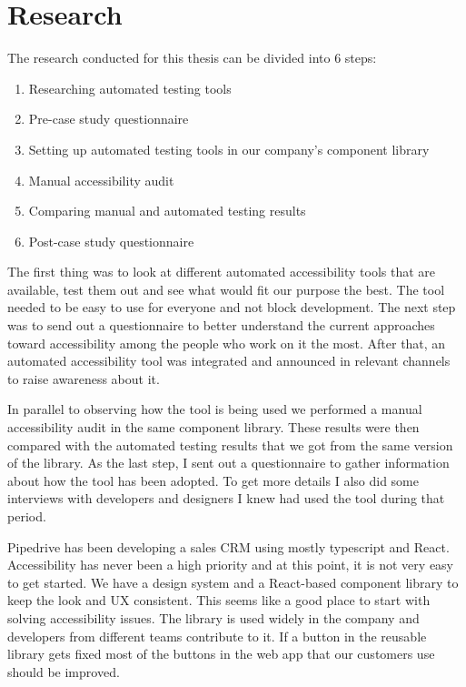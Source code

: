\documentclass{master_thesis}
\begin{document}
\section{Research}

The research conducted for this thesis can be divided into 6 steps:

\begin{enumerate}
	\item Researching automated testing tools
	\item Pre-case study questionnaire
	\item Setting up automated testing tools in our company's component library
	\item Manual accessibility audit
	\item Comparing manual and automated testing results
	\item Post-case study questionnaire
\end{enumerate}

The first thing was to look at different automated accessibility tools that are available, test them out and see what would fit our purpose the best. The tool needed to be easy to use for everyone and not block development. The next step was to send out a questionnaire to better understand the current approaches toward accessibility among the people who work on it the most. After that, an automated accessibility tool was integrated and announced in relevant channels to raise awareness about it.

In parallel to observing how the tool is being used we performed a manual accessibility audit in the same component library. These results were then compared with the automated testing results that we got from the same version of the library. As the last step, I sent out a questionnaire to gather information about how the tool has been adopted. To get more details I also did some interviews with developers and designers I knew had used the tool during that period.

Pipedrive has been developing a sales CRM using mostly typescript and React. Accessibility has never been a high priority and at this point, it is not very easy to get started. We have a design system and a React-based component library to keep the look and UX consistent. This seems like a good place to start with solving accessibility issues. The library is used widely in the company and developers from different teams contribute to it. If a button in the reusable library gets fixed most of the buttons in the web app that our customers use should be improved.
\end{document}
